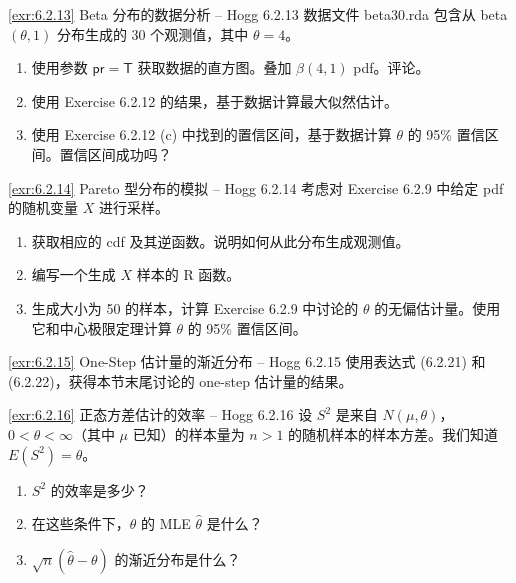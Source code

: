 \begin{exercise}{\ref{exr:6.2.13} Beta 分布的数据分析 – Hogg 6.2.13}\label{exr:6.2.13}
数据文件 beta30.rda 包含从 beta$(\theta,1)$ 分布生成的 30 个观测值，其中 $\theta=4$。

\begin{enumerate}
\item[(a)] 使用参数 $\mathsf{pr}=\mathsf{T}$ 获取数据的直方图。叠加 $\beta(4,1)$ pdf。评论。
\item[(b)] 使用 Exercise 6.2.12 的结果，基于数据计算最大似然估计。
\item[(c)] 使用 Exercise 6.2.12 (c) 中找到的置信区间，基于数据计算 $\theta$ 的 95\% 置信区间。置信区间成功吗？
\end{enumerate}
\end{exercise}

\begin{exercise}{\ref{exr:6.2.14} Pareto 型分布的模拟 – Hogg 6.2.14}\label{exr:6.2.14}
考虑对 Exercise 6.2.9 中给定 pdf 的随机变量 $X$ 进行采样。

\begin{enumerate}
\item[(a)] 获取相应的 cdf 及其逆函数。说明如何从此分布生成观测值。
\item[(b)] 编写一个生成 $X$ 样本的 R 函数。
\item[(c)] 生成大小为 50 的样本，计算 Exercise 6.2.9 中讨论的 $\theta$ 的无偏估计量。使用它和中心极限定理计算 $\theta$ 的 95\% 置信区间。
\end{enumerate}
\end{exercise}

\begin{exercise}{\ref{exr:6.2.15} One-Step 估计量的渐近分布 – Hogg 6.2.15}\label{exr:6.2.15}
使用表达式 (6.2.21) 和 (6.2.22)，获得本节末尾讨论的 one-step 估计量的结果。
\end{exercise}

\begin{exercise}{\ref{exr:6.2.16} 正态方差估计的效率 – Hogg 6.2.16}\label{exr:6.2.16}
设 $S^2$ 是来自 $N(\mu,\theta)$，$0 < \theta < \infty$（其中 $\mu$ 已知）的样本量为 $n>1$ 的随机样本的样本方差。我们知道 $E(S^2) = \theta$。

\begin{enumerate}
\item[(a)] $S^2$ 的效率是多少？
\item[(b)] 在这些条件下，$\theta$ 的 MLE $\widehat{\theta}$ 是什么？
\item[(c)] $\sqrt{n}(\widehat{\theta}-\theta)$ 的渐近分布是什么？
\end{enumerate}
\end{exercise}

